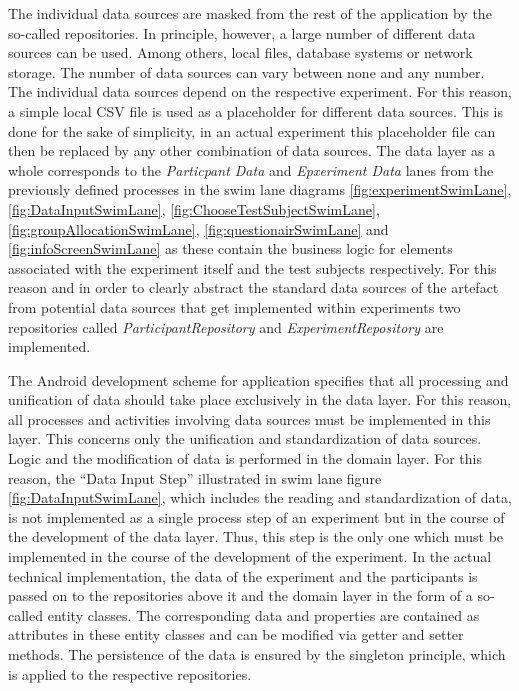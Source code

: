 The individual data sources are masked from the rest of the application by the so-called repositories. In principle, however, a large number of different data sources can be used. Among others, local files, database systems or network storage. The number of data sources can vary between none and any number. The individual data sources depend on the respective experiment. For this reason, a simple local CSV file is used as a placeholder for different data sources. This is done for the sake of simplicity, in an actual experiment this placeholder file can then be replaced by any other combination of data sources.
The data layer as a whole corresponds to the \textit{Particpant Data} and \textit{Epxeriment Data} lanes from the previously defined processes in the swim lane diagrams \ref{fig:experimentSwimLane}, \ref{fig:DataInputSwimLane}, \ref{fig:ChooseTestSubjectSwimLane}, \ref{fig:groupAllocationSwimLane}, \ref{fig:questionairSwimLane} and \ref{fig:infoScreenSwimLane} as these contain the business logic for elements associated with the experiment itself and the test subjects respectively. For this reason and in order to clearly abstract the standard data sources of the artefact from potential data sources that get implemented within experiments two repositories called \textit{ParticipantRepository} and \textit{ExperimentRepository} are implemented. 

The Android development scheme for application specifies that all processing and unification of data should take place exclusively in the data layer. For this reason, all processes and activities involving data sources must be implemented in this layer. This concerns only the unification and standardization of data sources. Logic and the modification of data is performed in the domain layer. For this reason, the \enquote{Data Input Step} illustrated in swim lane figure \ref{fig:DataInputSwimLane}, which includes the reading and standardization of data, is not implemented as a single process step of an experiment but in the course of the development of the data layer. Thus, this step is the only one which must be implemented in the course of the development of the experiment. In the actual technical implementation, the data of the experiment and the participants is passed on to the repositories above it and the domain layer in the form of a so-called entity classes. The corresponding data and properties are contained as attributes in these entity classes and can be modified via getter and setter methods. The persistence of the data is ensured by the singleton principle, which is applied to the respective repositories.

